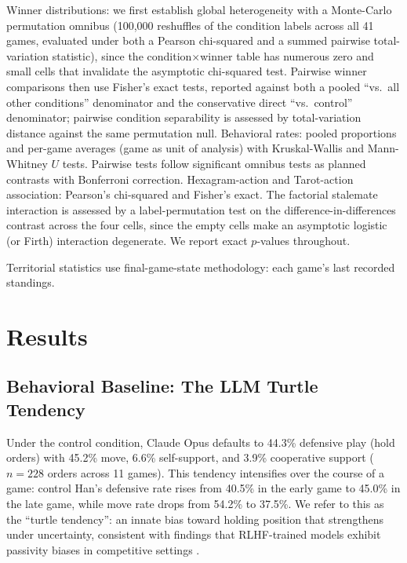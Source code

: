 \documentclass[11pt]{article}
\begin{document}
Winner distributions: we first establish global heterogeneity with a Monte-Carlo permutation omnibus (100{,}000 reshuffles of the condition labels across all 41 games, evaluated under both a Pearson chi-squared and a summed pairwise total-variation statistic), since the condition$\times$winner table has numerous zero and small cells that invalidate the asymptotic chi-squared test. Pairwise winner comparisons then use Fisher's exact tests, reported against both a pooled ``vs.\ all other conditions'' denominator and the conservative direct ``vs.\ control'' denominator; pairwise condition separability is assessed by total-variation distance against the same permutation null. Behavioral rates: pooled proportions and per-game averages (game as unit of analysis) with Kruskal-Wallis and Mann-Whitney $U$ tests. Pairwise tests follow significant omnibus tests as planned contrasts with Bonferroni correction. Hexagram-action and Tarot-action association: Pearson's chi-squared and Fisher's exact. The factorial stalemate interaction is assessed by a label-permutation test on the difference-in-differences contrast across the four cells, since the empty cells make an asymptotic logistic (or Firth) interaction degenerate. We report exact $p$-values throughout.

Territorial statistics use final-game-state methodology: each game's last recorded standings.


\section{Results}
\label{sec:results}

\subsection{Behavioral Baseline: The LLM Turtle Tendency}
\label{sec:turtle}

Under the control condition, Claude Opus defaults to 44.3\% defensive play (hold orders) with 45.2\% move, 6.6\% self-support, and 3.9\% cooperative support ($n = 228$ orders across 11 games). This tendency intensifies over the course of a game: control Han's defensive rate rises from 40.5\% in the early game to 45.0\% in the late game, while move rate drops from 54.2\% to 37.5\%. We refer to this as the ``turtle tendency'': an innate bias toward holding position that strengthens under uncertainty, consistent with findings that RLHF-trained models exhibit passivity biases in competitive settings \citep{Mukobi2023welfare}.
\end{document}
